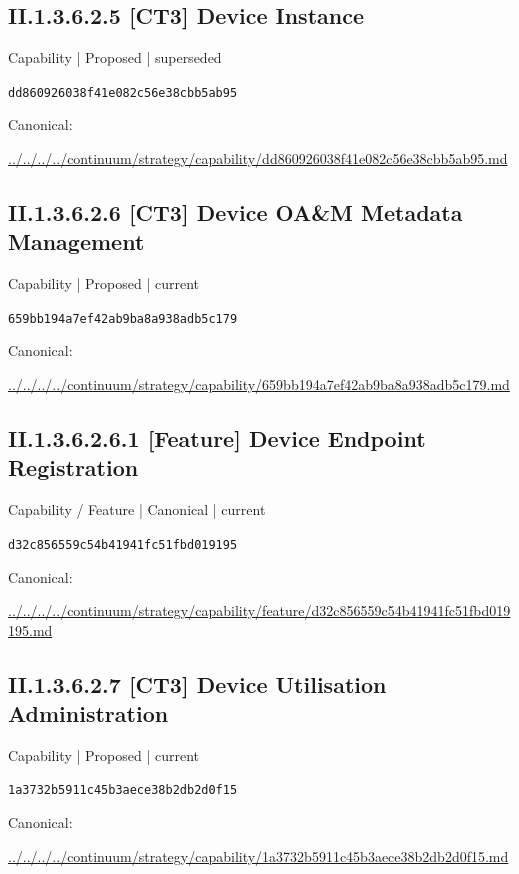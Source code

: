 \documentclass[10pt,a4paper]{article}
\begin{document}
\subsection*{II.1.3.6.2.5 [CT3] Device Instance}
{\small Capability | Proposed | superseded}\par
\texttt{dd860926038f41e082c56e38cbb5ab95}\par
Canonical: \par
{\footnotesize\url{../../../../continuum/strategy/capability/dd860926038f41e082c56e38cbb5ab95.md}}\par
\subsection*{II.1.3.6.2.6 [CT3] Device OA\&M Metadata Management}
{\small Capability | Proposed | current}\par
\texttt{659bb194a7ef42ab9ba8a938adb5c179}\par
Canonical: \par
{\footnotesize\url{../../../../continuum/strategy/capability/659bb194a7ef42ab9ba8a938adb5c179.md}}\par
\subsection*{II.1.3.6.2.6.1 [Feature] Device Endpoint Registration}
{\small Capability / Feature | Canonical | current}\par
\texttt{d32c856559c54b41941fc51fbd019195}\par
Canonical: \par
{\footnotesize\url{../../../../continuum/strategy/capability/feature/d32c856559c54b41941fc51fbd019195.md}}\par
\subsection*{II.1.3.6.2.7 [CT3] Device Utilisation Administration}
{\small Capability | Proposed | current}\par
\texttt{1a3732b5911c45b3aece38b2db2d0f15}\par
Canonical: \par
{\footnotesize\url{../../../../continuum/strategy/capability/1a3732b5911c45b3aece38b2db2d0f15.md}}\par
\end{document}

